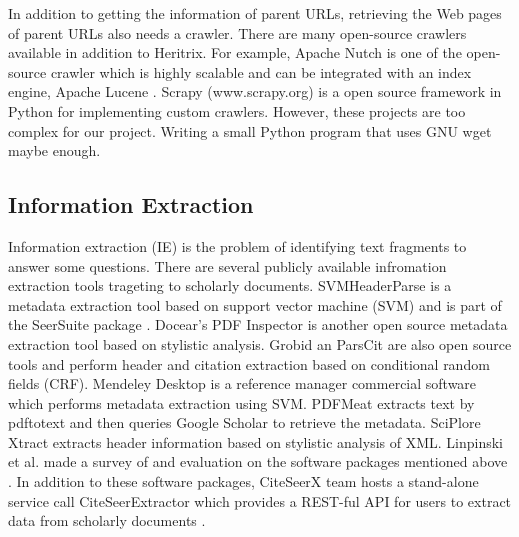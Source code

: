 \documentclass[prodmode]{acmsmall} %
\begin{document}
In addition to getting the information of parent URLs, retrieving the Web pages of parent URLs also needs a crawler. There are many open-source crawlers available in addition to Heritrix. For example, Apache Nutch is one of the open-source crawler  which is highly scalable and can be integrated with an index engine, Apache Lucene \cite{khare2004nutch}. Scrapy (www.scrapy.org) is a open source framework in Python for implementing custom crawlers. However, these projects are too complex for our project. Writing a small Python program that uses GNU wget \cite{niksic1998gnu} maybe enough.

\subsection{Information Extraction}

Information extraction (IE) is the problem of identifying text fragments to answer some questions. There are several publicly available infromation extraction tools trageting to scholarly documents. SVMHeaderParse is a metadata extraction tool based on support vector machine (SVM) and is part of the SeerSuite package \cite{han2003automatic}.  Docear's PDF Inspector is another open source metadata extraction tool based on stylistic analysis. Grobid \cite{lopez2009grobid} an ParsCit \cite{councill2008parscit} are also open source tools and perform header and citation extraction based on conditional random fields (CRF). Mendeley Desktop is a reference manager commercial software which performs metadata extraction using SVM. PDFMeat \cite{aumuller2011pdfmeat} extracts text by pdftotext and then queries Google Scholar to retrieve the metadata. SciPlore Xtract \cite{beel2010sciplore} extracts header information based on stylistic analysis of XML. Linpinski et al. made a survey of and evaluation on the software packages mentioned above \cite{lipinski2013evaluation}. In addition to these software packages, CiteSeerX team hosts a stand-alone service call CiteSeerExtractor which provides a REST-ful API for users to extract data from scholarly documents \cite{williams2014scholarly}.
\end{document}
